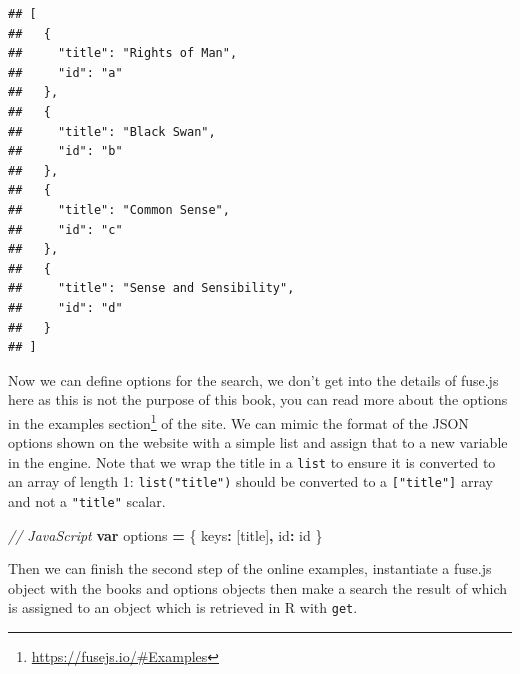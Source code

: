 \documentclass[
]{krantz}
\makeatletter
\newenvironment{Shaded}{\begin{snugshade}}{\end{snugshade}}
\newcommand{\CommentTok}[1]{\textcolor[rgb]{0.37,0.37,0.37}{\textit{#1}}}
\newcommand{\DataTypeTok}[1]{\textcolor[rgb]{0.27,0.27,0.27}{#1}}
\newcommand{\KeywordTok}[1]{\textcolor[rgb]{0.27,0.27,0.27}{\textbf{#1}}}
\newcommand{\NormalTok}[1]{#1}
\newcommand{\OperatorTok}[1]{\textcolor[rgb]{0.43,0.43,0.43}{\textbf{#1}}}
\newcommand{\StringTok}[1]{\textcolor[rgb]{0.5,0.5,0.5}{#1}}
\renewcommand{\href}[2]{#2\footnote{\url{#1}}}
\newenvironment{kframe}{%
\medskip{}
\setlength{\fboxsep}{.8em}
 \def\at@end@of@kframe{}%
 \ifinner\ifhmode%
  \def\at@end@of@kframe{\end{minipage}}%
  \begin{minipage}{\columnwidth}%
 \fi\fi%
 \def\FrameCommand##1{\hskip\@totalleftmargin \hskip-\fboxsep
 \colorbox{shadecolor}{##1}\hskip-\fboxsep
     \hskip-\linewidth \hskip-\@totalleftmargin \hskip\columnwidth}%
 \MakeFramed {\advance\hsize-\width
   \@totalleftmargin\z@ \linewidth\hsize
   \@setminipage}}%
 {\par\unskip\endMakeFramed%
 \at@end@of@kframe}
\renewenvironment{Shaded}{\begin{kframe}}{\end{kframe}}
\makeatother
\begin{document}
\begin{verbatim}
## [
##   {
##     "title": "Rights of Man",
##     "id": "a"
##   },
##   {
##     "title": "Black Swan",
##     "id": "b"
##   },
##   {
##     "title": "Common Sense",
##     "id": "c"
##   },
##   {
##     "title": "Sense and Sensibility",
##     "id": "d"
##   }
## ]
\end{verbatim}

Now we can define options for the search, we don't get into the details of fuse.js here as this is not the purpose of this book, you can read more about the options in the \href{https://fusejs.io/\#Examples}{examples section} of the site. We can mimic the format of the JSON options shown on the website with a simple list and assign that to a new variable in the engine. Note that we wrap the title in a \texttt{list} to ensure it is converted to an array of length 1: \texttt{list("title")} should be converted to a \texttt{{[}"title"{]}} array and not a \texttt{"title"} scalar.

\begin{Shaded}
\begin{Highlighting}[]
\CommentTok{// JavaScript}
\KeywordTok{var}\NormalTok{ options }\OperatorTok{=}\NormalTok{ \{}
  \DataTypeTok{keys}\OperatorTok{:}\NormalTok{ [}\StringTok{\textquotesingle{}title\textquotesingle{}}\NormalTok{]}\OperatorTok{,}
  \DataTypeTok{id}\OperatorTok{:} \StringTok{\textquotesingle{}id\textquotesingle{}}
\NormalTok{\}}
\end{Highlighting}
\end{Shaded}

\begin{Shaded}
\end{Shaded}

Then we can finish the second step of the online examples, instantiate a fuse.js object with the books and options objects then make a search the result of which is assigned to an object which is retrieved in R with \texttt{get}.

\begin{Shaded}
\end{Shaded}
\end{document}
